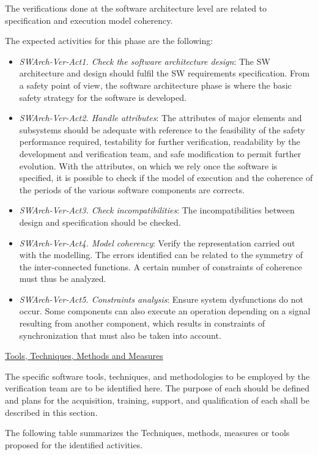 The verifications done at the software architecture level are related
to specification and execution model coherency.

The expected activities for this phase are the following:
\begin{itemize}
\item {\it SWArch-Ver-Act1. Check the software architecture design}:
  The SW architecture and design should fulfil the SW requirements
  specification. From a safety point of view, the software
  architecture phase is where the basic safety strategy for the
  software is developed. 
\item {\it SWArch-Ver-Act2. Handle attributes}: The attributes of
  major elements and subsystems should be adequate with reference to
  the feasibility of the safety performance required, testability for
  further verification, readability by the development and
  verification team, and safe modification to permit further
  evolution. With the attributes, on which we rely once the software
  is specified, it is possible to check if the model of execution and
  the coherence of the periods of the various software components are
  corrects. 
\item {\it SWArch-Ver-Act3. Check incompatibilities}: The
  incompatibilities between design and specification should be
  checked.  
\item {\it SWArch-Ver-Act4. Model coherency}: Verify the
  representation carried out with the modelling. The errors identified
  can be related to the symmetry of the inter-connected functions. A
  certain number of constraints of coherence must thus be analyzed.  
\item {\it SWArch-Ver-Act5. Constraints analysis}: Ensure system
  dysfunctions do not occur. Some components can also execute an
  operation depending on a signal resulting from another component,
  which results in constraints of synchronization that must also be
  taken into account.  

\end{itemize}

\underline{Tools, Techniques, Methods and Measures} 

The specific software tools, techniques, and methodologies to be
employed by the verification team are to be identified here.  The
purpose of each should be defined and plans for the acquisition,
training, support, and qualification of each shall be described in
this section.

The following table summarizes the Techniques, methods, measures or
tools proposed for the identified activities.

